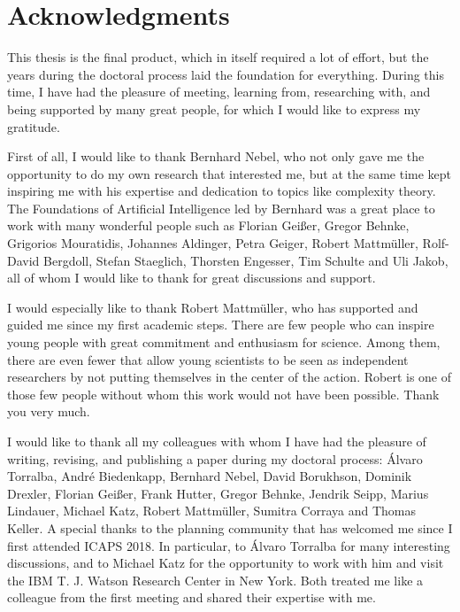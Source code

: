\thispagestyle{empty}
\chapter*{Acknowledgments}

This thesis is the final product, which in itself required a lot of effort, but the years during the doctoral process laid the foundation for everything. 
During this time, I have had the pleasure of meeting, learning from, researching with, and being supported by many great people, for which I would like to express my gratitude.

First of all, I would like to thank Bernhard Nebel, who not only gave me the opportunity to do my own research that interested me, but at the same time kept inspiring me with his expertise and dedication to topics like complexity theory.
The Foundations of Artificial Intelligence led by Bernhard was a great place to work with many wonderful people such as Florian Gei{\ss}er, Gregor Behnke, Grigorios Mouratidis, Johannes Aldinger, Petra Geiger, Robert Mattm{\"u}ller, Rolf-David Bergdoll, Stefan Staeglich, Thorsten Engesser, Tim Schulte and Uli Jakob, all of whom I would like to thank for great discussions and support. 

I would especially like to thank Robert Mattm{\"u}ller, who has supported and guided me since my first academic steps.
There are few people who can inspire young people with great commitment and enthusiasm for science. 
Among them, there are even fewer that allow young scientists to be seen as independent researchers by not putting themselves in the center of the action.
Robert is one of those few people without whom this work would not have been possible. Thank you very much.

I would like to thank all my colleagues with whom I have had the pleasure of writing, revising, and publishing a paper during my doctoral process: {\'A}lvaro Torralba, Andr{\'e} Biedenkapp, Bernhard Nebel, David Borukhson, Dominik Drexler, Florian Gei{\ss}er, Frank Hutter, Gregor Behnke, Jendrik Seipp, Marius Lindauer, Michael Katz, Robert Mattm{\"u}ller, Sumitra Corraya and Thomas Keller.
A special thanks to the planning community that has welcomed me since I first attended ICAPS 2018. 
In particular, to {\'A}lvaro Torralba for many interesting discussions, and to Michael Katz for the opportunity to work with him and visit the IBM T. J. Watson Research Center in New York. 
Both treated me like a colleague from the first meeting and shared their expertise with me.

